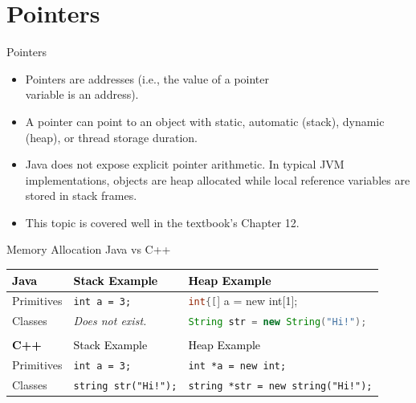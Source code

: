 \documentclass[14pt,aspectratio=1610]{beamer}
\begin{document}
\section{Pointers}
\begin{frame}{Pointers}

\begin{itemize}[<+->]
\item
  Pointers are addresses (i.e., the value of a pointer\\ variable is an address).
\item
  A pointer can point to an object with static, automatic (stack), dynamic
  (heap), or thread storage duration.
\item
  Java does not expose explicit pointer arithmetic. In typical JVM
  implementations, objects are heap allocated while local reference variables
  are stored in stack frames.
\item
  This topic is covered well in the textbook's Chapter 12.
\end{itemize}
\end{frame}

\begin{frame}{Memory Allocation Java vs C++}
\small
\begin{tabularx}{1\textwidth}{| l l X |}
\hline
\rowcolor{CSUgold}\textcolor{black}{\textbf{Java}}  & \textcolor{black}{Stack Example}   & \textcolor{black}{Heap Example} \\ \hline
Primitives & \cellcolor{codeBackground}\lstinline{int a = 3;}   & \cellcolor{codeBackground}\lstinline[language=Java]{int{[}{]} a = new int{[}1{]};} \\ %
Classes    & \textit{Does not exist.} & \cellcolor{codeBackground}\lstinline[language=Java]{String str = new String("Hi!");} \\ \hline
\multicolumn{3}{c}{}\\\hline

\rowcolor{CSUgold}\textcolor{black}{\textbf{C++}}  & \textcolor{black}{Stack Example}   & \textcolor{black}{Heap Example} \\ \hline
Primitives & \cellcolor{codeBackground}\lstinline{int a = 3;}   & \cellcolor{codeBackground}\lstinline{int *a = new int;} \\ %
Classes    & \cellcolor{codeBackground}\lstinline{string str("Hi!");}  & \cellcolor{codeBackground}\lstinline{string *str = new string("Hi!");}\\ \hline
\end{tabularx}

\end{frame}
\end{document}
